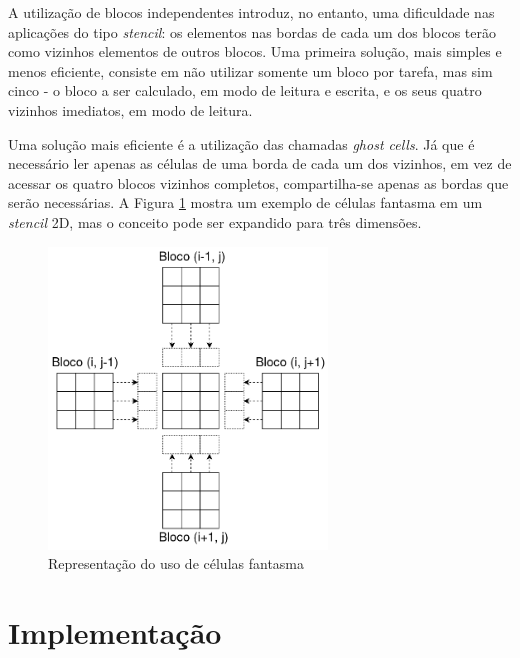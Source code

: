 \documentclass[cic,tc]{iiufrgs}
\begin{document}
A utilização de blocos independentes introduz, no entanto, uma dificuldade nas aplicações do tipo \textit{stencil}: os elementos nas bordas de cada um dos blocos terão como vizinhos
elementos de outros blocos. Uma primeira solução, mais simples e menos eficiente, consiste em não utilizar somente um bloco por tarefa, mas sim cinco - o bloco a ser calculado, em
modo de leitura e escrita, e os seus quatro vizinhos imediatos, em modo de leitura.

Uma solução mais eficiente é a utilização das chamadas \textit{ghost cells}. Já que é necessário ler apenas as células de uma borda de cada um dos vizinhos, em vez de acessar os quatro
blocos vizinhos completos, compartilha-se apenas as bordas que serão necessárias. A Figura \ref{fig:ghost_cells} mostra um exemplo de células fantasma em um \textit{stencil} 2D,
mas o conceito pode ser expandido para três dimensões.

\begin{figure}[!htb]
    \caption{Representação do uso de células fantasma}
    \begin{center}
      \includegraphics[width=20em]{ghost_cells}
    \end{center}
    \label{fig:ghost_cells}
\end{figure}

\section{Implementação}
\end{document}
